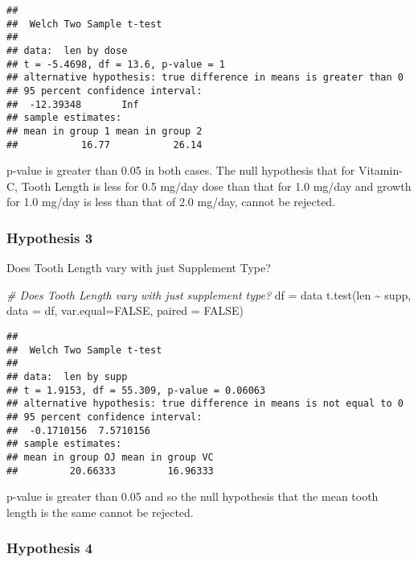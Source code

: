 \documentclass[
]{article}
\newenvironment{Shaded}{\begin{snugshade}}{\end{snugshade}}
\newcommand{\AttributeTok}[1]{\textcolor[rgb]{0.77,0.63,0.00}{#1}}
\newcommand{\CommentTok}[1]{\textcolor[rgb]{0.56,0.35,0.01}{\textit{#1}}}
\newcommand{\ConstantTok}[1]{\textcolor[rgb]{0.00,0.00,0.00}{#1}}
\newcommand{\FunctionTok}[1]{\textcolor[rgb]{0.00,0.00,0.00}{#1}}
\newcommand{\NormalTok}[1]{#1}
\newcommand{\OtherTok}[1]{\textcolor[rgb]{0.56,0.35,0.01}{#1}}
\newcommand{\SpecialCharTok}[1]{\textcolor[rgb]{0.00,0.00,0.00}{#1}}
\begin{document}
\begin{verbatim}
## 
##  Welch Two Sample t-test
## 
## data:  len by dose
## t = -5.4698, df = 13.6, p-value = 1
## alternative hypothesis: true difference in means is greater than 0
## 95 percent confidence interval:
##  -12.39348       Inf
## sample estimates:
## mean in group 1 mean in group 2 
##           16.77           26.14
\end{verbatim}

p-value is greater than 0.05 in both cases. The null hypothesis that for
Vitamin-C, Tooth Length is less for 0.5 mg/day dose than that for 1.0
mg/day and growth for 1.0 mg/day is less than that of 2.0 mg/day, cannot
be rejected.

\hypertarget{hypothesis-3}{%
\subsubsection{Hypothesis 3}\label{hypothesis-3}}

Does Tooth Length vary with just Supplement Type?

\begin{Shaded}
\begin{Highlighting}[]
\CommentTok{\# Does Tooth Length vary with just supplement type?}
\NormalTok{df }\OtherTok{=}\NormalTok{ data}
\FunctionTok{t.test}\NormalTok{(len }\SpecialCharTok{\textasciitilde{}}\NormalTok{ supp, }\AttributeTok{data =}\NormalTok{ df, }\AttributeTok{var.equal=}\ConstantTok{FALSE}\NormalTok{, }\AttributeTok{paired =} \ConstantTok{FALSE}\NormalTok{)}
\end{Highlighting}
\end{Shaded}

\begin{verbatim}
## 
##  Welch Two Sample t-test
## 
## data:  len by supp
## t = 1.9153, df = 55.309, p-value = 0.06063
## alternative hypothesis: true difference in means is not equal to 0
## 95 percent confidence interval:
##  -0.1710156  7.5710156
## sample estimates:
## mean in group OJ mean in group VC 
##         20.66333         16.96333
\end{verbatim}

p-value is greater than 0.05 and so the null hypothesis that the mean
tooth length is the same cannot be rejected.

\hypertarget{hypothesis-4}{%
\subsubsection{Hypothesis 4}\label{hypothesis-4}}
\end{document}
